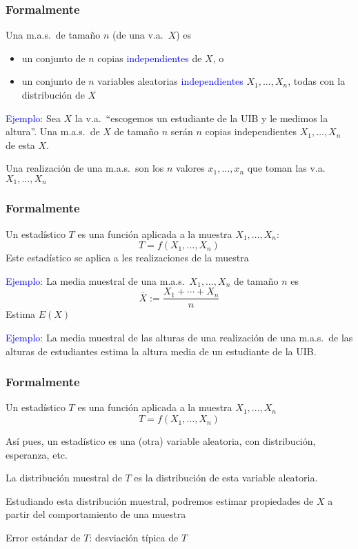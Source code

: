 \documentclass[12pt,t]{beamer}\usepackage[]{graphicx}\usepackage[]{color}
\newcommand{\blue}[1]{\textcolor{blue}{#1}}
\renewcommand{\emph}[1]{{\color{red}#1}}
\theoremstyle{plain}
\theoremstyle{definition}
\begin{document}
\begin{frame}
\frametitle{Formalmente}

Una \emph{m.a.s.\ de tamaño $n$} (de una v.a.\ $X$) es
\begin{itemize}
\item  un conjunto de $n$ copias \blue{independientes} de $X$, o

\item un conjunto de $n$ variables aleatorias  \blue{independientes} $X_1,\ldots,X_n$, todas con la distribución de  $X$
\end{itemize}
\medskip


\blue{Ejemplo:} Sea $X$ la v.a.\ ``escogemos un estudiante de la UIB y le medimos la altura''. Una m.a.s.\ de $X$ de tamaño $n$ serán $n$ copias independientes $X_1,\ldots,X_n$ de esta $X$.
\bigskip


Una \emph{realización} de una m.a.s.\ son los $n$ valores $x_1,\ldots,x_n$ que  toman las v.a.\ $X_1,\ldots,X_n$

\end{frame}


\begin{frame}
\frametitle{Formalmente}

Un  \emph{estadístico} $T$ es una función aplicada a la muestra $X_1,\ldots,X_n$:
$$
T=f(X_1,\ldots,X_n)
$$
Este estadístico se aplica a les realizaciones  de la muestra
\medskip

\blue{Ejemplo:} La \emph{media muestral} de una m.a.s.\ $X_1,\ldots,X_n$ de tamaño $n$ es 
$$
\overline{X}:=\frac{X_1+\cdots+X_n}{n}
$$
Estima $E(X)$
\medskip

\blue{Ejemplo:} La media muestral de las alturas de una
realización de una m.a.s.\ de  las alturas  de estudiantes estima  la altura media de un estudiante de la UIB.




\end{frame}


\begin{frame}
\frametitle{Formalmente}

Un  \emph{estadístico} $T$ es una función aplicada a la muestra $X_1,\ldots,X_n$
$$
T=f(X_1,\ldots,X_n)
$$
\medskip

Así pues, un estadístico es una (otra) variable aleatoria, con distribución, esperanza, etc.
\medskip

La \emph{distribución muestral} de $T$ es la distribución de  esta variable aleatoria.
\medskip

Estudiando  esta distribución muestral, podremos estimar propiedades de $X$ a partir del comportamiento de una muestra
\medskip

\emph{Error estándar de $T$}: desviación típica de $T$


\end{frame}
\end{document}
